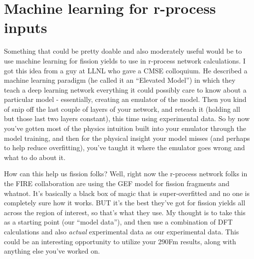 \section{Machine learning for r-process inputs}\label{sect:ml4rprocess}
Something that could be pretty doable and also moderately useful would be to use machine learning for fission yields to use in r-process network calculations. I got this idea from a guy at LLNL who gave a CMSE colloquium. He described a machine learning paradigm (he called it an ``Elevated Model'') in which they teach a deep learning network everything it could possibly care to know about a particular model - essentially, creating an emulator of the model. Then you kind of snip off the last couple of layers of your network, and reteach it (holding all but those last two layers constant), this time using experimental data. So by now you've gotten most of the physics intuition built into your emulator through the model training, and then for the physical insight your model misses (and perhaps to help reduce overfitting), you've taught it where the emulator goes wrong and what to do about it.

How can this help us fission folks? Well, right now the r-process network folks in the FIRE collaboration are using the GEF model for fission fragments and whatnot. It's basically a black box of magic that is super-overfitted and no one is completely sure how it works. BUT it's the best they've got for fission yields all across the region of interest, so that's what they use. My thought is to take this as a starting point (our ``model data''), and then use a combination of DFT calculations and also \textit{actual} experimental data as our experimental data. This could be an interesting opportunity to utilize your 290Fm results, along with anything else you've worked on.


